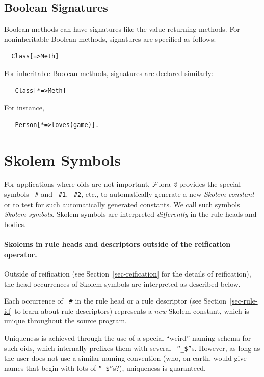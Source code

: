 \documentclass[11pt]{article}
\newcommand{\FLORA}{{\mbox{\sc ${\cal F}${lora}\rm\emph{-2}}}\xspace}
\begin{document}
\subsection{Boolean Signatures}

Boolean methods can have signatures like the value-returning methods.
For noninheritable Boolean methods, signatures are specified as follows:
\begin{verbatim}
  Class[=>Meth]
\end{verbatim}
For inheritable Boolean methods, signatures are declared similarly:
\begin{verbatim}
   Class[*=>Meth]
\end{verbatim}
For instance,
\begin{verbatim}
   Person[*=>loves(game)].
\end{verbatim}


\section{Skolem Symbols}\label{sec-anon-gen-oids}


%
For applications where oids are not important, \FLORA provides the special
symbols \verb|_#| and \verb|_#1|, \verb|_#2|, etc.,
to automatically generate a new
\emph{Skolem constant} or to test for such automatically generated
constants. We call such symbols \emph{Skolem symbols}.   Skolem symbols are
interpreted \emph{differently}
in the rule heads and bodies.

\paragraph{Skolems in rule heads and descriptors outside of the reification
  operator.}
Outside of reification (see
Section~\ref{sec-reification} for the details of reification), the
head-occurrences of Skolem symbols are interpreted as described below.

Each occurrence of \verb|_#| in the rule head or a rule descriptor (see
Section~\ref{sec-rule-id} to learn about rule descriptors)
represents a \emph{new} Skolem constant, which is unique throughout
the source program.

Uniqueness is achieved through the use of a special ``weird'' naming
schema for such oids, which internally prefixes them with several {\tt
  ``\_\$''}s. However, as long as the user does not use a similar
naming convention (who, on earth, would give names that begin with lots of
{\tt ``\_\$''}s?), uniqueness is guaranteed.
\end{document}
